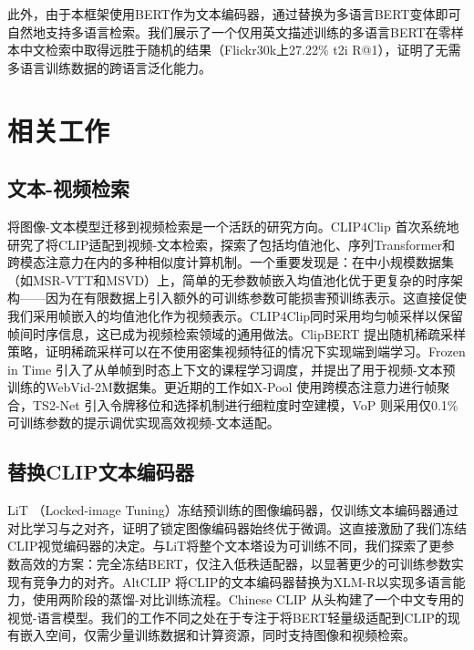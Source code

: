 \documentclass[10pt,a4paper]{ctexart}
\begin{document}
此外，由于本框架使用BERT作为文本编码器，通过替换为多语言BERT变体即可自然地支持多语言检索。我们展示了一个仅用英文描述训练的多语言BERT在零样本中文检索中取得远胜于随机的结果（Flickr30k上27.22\% t2i R@1），证明了无需多语言训练数据的跨语言泛化能力。

\section{相关工作}

\subsection{文本-视频检索}

将图像-文本模型迁移到视频检索是一个活跃的研究方向。CLIP4Clip \citep{luo2022clip4clip}首次系统地研究了将CLIP适配到视频-文本检索，探索了包括均值池化、序列Transformer和跨模态注意力在内的多种相似度计算机制。一个重要发现是：在中小规模数据集（如MSR-VTT和MSVD）上，简单的无参数帧嵌入均值池化优于更复杂的时序架构——因为在有限数据上引入额外的可训练参数可能损害预训练表示。这直接促使我们采用帧嵌入的均值池化作为视频表示。CLIP4Clip同时采用均匀帧采样以保留帧间时序信息，这已成为视频检索领域的通用做法。ClipBERT \citep{lei2021clipbert}提出随机稀疏采样策略，证明稀疏采样可以在不使用密集视频特征的情况下实现端到端学习。Frozen in Time \citep{bain2021frozen}引入了从单帧到时态上下文的课程学习调度，并提出了用于视频-文本预训练的WebVid-2M数据集。更近期的工作如X-Pool \citep{gorti2022xpool}使用跨模态注意力进行帧聚合，TS2-Net \citep{liu2022ts2net}引入令牌移位和选择机制进行细粒度时空建模，VoP \citep{huang2023vop}则采用仅0.1\%可训练参数的提示调优实现高效视频-文本适配。

\subsection{替换CLIP文本编码器}

LiT \citep{zhai2022lit}（Locked-image Tuning）冻结预训练的图像编码器，仅训练文本编码器通过对比学习与之对齐，证明了锁定图像编码器始终优于微调。这直接激励了我们冻结CLIP视觉编码器的决定。与LiT将整个文本塔设为可训练不同，我们探索了更参数高效的方案：完全冻结BERT，仅注入低秩适配器，以显著更少的可训练参数实现有竞争力的对齐。AltCLIP \citep{chen2022altclip}将CLIP的文本编码器替换为XLM-R以实现多语言能力，使用两阶段的蒸馏-对比训练流程。Chinese CLIP \citep{yang2022chinese}从头构建了一个中文专用的视觉-语言模型。我们的工作不同之处在于专注于将BERT轻量级适配到CLIP的现有嵌入空间，仅需少量训练数据和计算资源，同时支持图像和视频检索。
\end{document}
